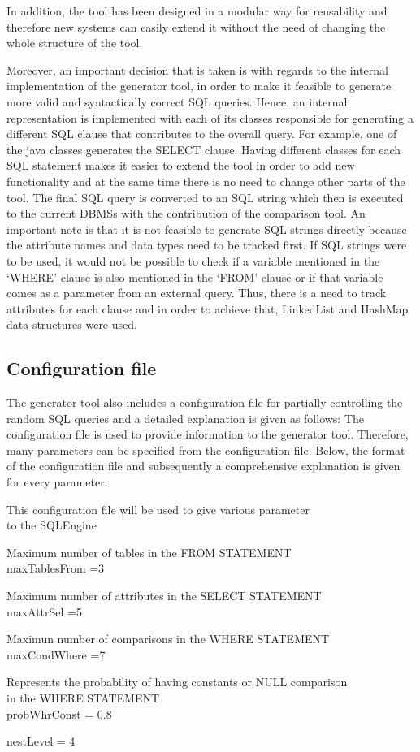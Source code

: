 In addition, the tool has been designed in a modular way for reusability and therefore new systems can easily extend it without the need of changing the whole structure of the tool.

Moreover, an important decision that is taken is with regards to the internal implementation of the generator tool, in order to make it feasible to generate more valid and syntactically correct SQL queries. Hence, an internal representation is implemented with each of its classes responsible for generating a different SQL clause that contributes to the overall query. For example, one of the java classes generates the SELECT clause. Having different classes for each SQL statement makes it easier to extend the tool in order to add new functionality and at the same time there is no need to change other parts of the tool. The final SQL query is converted to an SQL string which then is executed to the current DBMSs with the contribution of the comparison tool. An important note is that it is not feasible to generate SQL strings directly because the attribute names and data types need to be tracked first. If SQL strings were to be used, it would not be possible to check if a variable mentioned in the ‘WHERE’ clause is also mentioned in the ‘FROM’ clause or if that variable comes as a parameter from an external query. Thus, there is a need to track attributes for each clause and in order to achieve that, LinkedList and HashMap data-structures were used.


\subsection{Configuration file}
The generator tool also includes a configuration file for partially controlling the random SQL queries and a detailed explanation is given as follows: The configuration file is used to provide information to the generator tool. Therefore, many parameters can be specified from the configuration file. Below, the format of the configuration file and subsequently a comprehensive explanation is given  for every parameter. 


\begin{mdframed}[backgroundcolor=gray!20] 
  This configuration file will be used to give various parameter
  \\ to the SQLEngine

  Maximum number of tables in the FROM STATEMENT
\\maxTablesFrom =3

  Maximum number of attributes in the SELECT STATEMENT
\\maxAttrSel =5

  Maximun number of comparisons in the WHERE STATEMENT
\\maxCondWhere =7

 Represents the probability of having constants or NULL comparison \\ in the WHERE STATEMENT
\\probWhrConst = 0.8

 nestLevel = 4
\end{mdframed}

